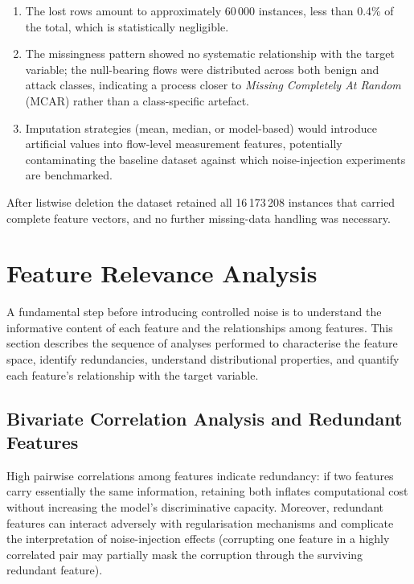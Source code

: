 \begin{enumerate}
  \item The lost rows amount to approximately 60\,000 instances, less than
        0.4\% of the total, which is statistically negligible.
  \item The missingness pattern showed no systematic relationship with the
        target variable; the null-bearing flows were distributed across both
        benign and attack classes, indicating a process closer to
        \emph{Missing Completely At Random} (MCAR) rather than a
        class-specific artefact.
  \item Imputation strategies (mean, median, or model-based) would introduce
        artificial values into flow-level measurement features, potentially
        contaminating the baseline dataset against which noise-injection
        experiments are benchmarked.
\end{enumerate}

After listwise deletion the dataset retained all 16\,173\,208 instances that
carried complete feature vectors, and no further missing-data handling was
necessary.

\section{Feature Relevance Analysis}
\label{sec:feature-relevance}

A fundamental step before introducing controlled noise is to understand the
informative content of each feature and the relationships among features.
This section describes the sequence of analyses performed to characterise the
feature space, identify redundancies, understand distributional properties, and
quantify each feature's relationship with the target variable.

\subsection{Bivariate Correlation Analysis and Redundant Features}
\label{sec:corr-analysis}

High pairwise correlations among features indicate redundancy: if two features
carry essentially the same information, retaining both inflates computational
cost without increasing the model's discriminative capacity.  Moreover,
redundant features can interact adversely with regularisation mechanisms and
complicate the interpretation of noise-injection effects (corrupting one feature
in a highly correlated pair may partially mask the corruption through the
surviving redundant feature).

